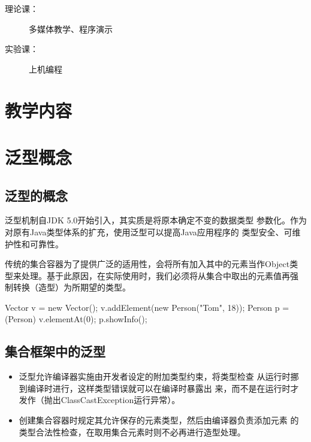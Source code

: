\sline
\begin{description}
\item[理论课：] 多媒体教学、程序演示
\item[实验课：] 上机编程
\end{description}

\newpage
\section*{教学内容}
\sline

\section{泛型概念}

\subsection{泛型的概念}

泛型机制自JDK 5.0开始引入，其实质是{\hei\Blue 将原本确定不变的数据类型
  参数化}。作为对原有Java类型体系的扩充，使用泛型可以提高Java应用程序的
类型安全、可维护性和可靠性。

传统的集合容器为了提供广泛的适用性，会将所有加入其中的元素当作Object类
型来处理。基于此原因，在实际使用时，我们必须将从集合中取出的元素值再强
制转换（造型）为所期望的类型。
  

\begin{javaCode}
  Vector v = new Vector();
  v.addElement(new Person("Tom", 18));
  Person p = (Person) v.elementAt(0);
  p.showInfo();
\end{javaCode}
  
\subsection{集合框架中的泛型}

\begin{itemize}
\item 泛型允许编译器实施由开发者设定的附加类型约束，将类型检查
  从{\hei\Blue 运行时挪到编译时}进行，这样类型错误就可以在编译时暴露出
  来，而不是在运行时才发作（抛出ClassCastException运行异常）。
\item 创建集合容器时规定其允许保存的元素类型，然后由编译器负责添加元素
  的类型合法性检查，在取用集合元素时则不必再进行造型处理。
\end{itemize}

